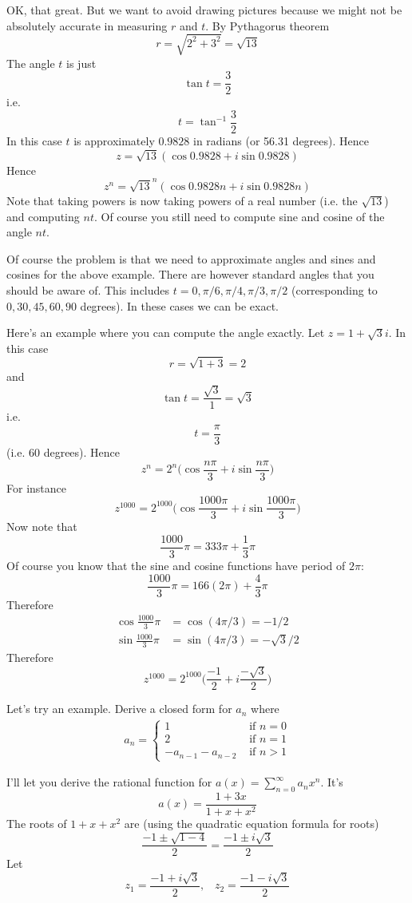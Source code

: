 OK, that great.
But we want to avoid drawing pictures because we might
not be absolutely accurate in measuring
$r$ and $t$.
By Pythagorus theorem 
\[
r = \sqrt{2^2 + 3^2} = \sqrt{13}
\]
The angle $t$ is just
\[
\tan t = \frac{3}{2}
\]
i.e.
\[
t = \tan^{-1} \frac{3}{2}
\]
In this case $t$ is approximately $0.9828$ in radians (or 56.31 degrees).
Hence
\[
z = \sqrt{13} (\cos 0.9828 + i \sin 0.9828)
\]
Hence
\[
z^n = \sqrt{13}^n (\cos 0.9828n + i \sin 0.9828n)
\]
Note that taking powers is now taking powers of a real number
(i.e. the
$\sqrt{13}$) and computing $nt$.
Of course you still need to compute sine and cosine
of the angle $nt$. 

Of course the problem is that we need to approximate angles and sines and 
cosines for the above example.
There are however standard angles that you should be aware of.
This includes $t = 0, \pi/6, \pi/4, \pi/3, \pi/2$ (corresponding to
$0, 30, 45, 60, 90$ degrees).
In these cases we can be exact.

Here's an example where you can compute the angle exactly.
Let $z = 1 + \sqrt{3} i$. In this case
\[
r = \sqrt{1 + 3} = 2
\]
and
\[
\tan t = \frac{\sqrt{3}}{1} = \sqrt{3}
\]
i.e. 
\[
t = \frac{\pi}{3}
\]
(i.e. 60 degrees).
Hence 
\[
z^n = 2^n 
\biggl( 
\cos \frac{n\pi}{3}
+ i \sin \frac{n\pi}{3}
\biggr)
\]
For instance
\[
z^{1000} = 2^{1000} 
\biggl( 
\cos \frac{1000\pi}{3}
+ i \sin \frac{1000\pi}{3}
\biggr)
\]
Now note that 
\[
\frac{1000}{3}\pi 
=
333\pi + \frac{1}{3}\pi
\]
Of course you know that the sine and cosine functions have period of $2\pi$:
\[
\frac{1000}{3}\pi 
=
166(2\pi) + \frac{4}{3} \pi
\]
Therefore
\begin{align*}
\cos \frac{1000}{3}\pi &= \cos(4\pi/3) = -1/2\\
\sin \frac{1000}{3}\pi &= \sin(4\pi/3) = -\sqrt{3}/2
\end{align*}
Therefore
\[
z^{1000} =
2^{1000}
\biggl( 
\frac{-1}{2}
+ i
\frac{-\sqrt{3}}{2}
\biggr)
\]

Let's try an example.
Derive a closed form for $a_n$ where
\begin{align*}
a_n = 
\begin{cases}
1 & \text{ if } n = 0 \\
2 & \text{ if } n = 1 \\
-a_{n-1} - a_{n-2} &\text{ if } n > 1 
\end{cases}
\end{align*}

I'll let you derive the rational function for 
$a(x) = \sum_{n=0}^\infty a_n x^n$.
It's
\[
a(x) = \frac{1 + 3x}{1 + x + x^2}
\]
The roots of $1 + x + x^2$ are (using the quadratic equation formula for roots)
\[
\frac{-1 \pm \sqrt{1 - 4}}{2}
= \frac{-1 \pm i\sqrt{3}}{2}
\]
Let 
\[
z_1 = \frac{-1 + i\sqrt{3}}{2}, \,\,\,\,\,
z_2 = \frac{-1 - i\sqrt{3}}{2}
\]

